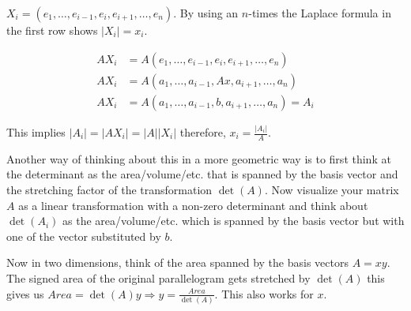 \(X_i = (e_1, \dots, e_{i - 1}, e_i, e_{i + 1}, \dots, e_n)\). By using an \(n\)-times the 
Laplace formula in the first row shows \(|X_i| = x_i\).

\begin{align*}
	A X_i &= A (e_1, \dots, e_{i - 1}, e_i, e_{i + 1}, \dots, e_n)\\
	A X_i &= A (a_1, \dots, a_{i - 1}, Ax, a_{i + 1}, \dots, a_n)\\
	A X_i &= A (a_1, \dots, a_{i - 1}, b, a_{i + 1}, \dots, a_n) = A_i
\end{align*}

This implies \(|A_i| = |AX_i| = |A||X_i|\) therefore, \(x_i = \frac{|A_i|}{A}\).

\QED

Another way of thinking about this in a more geometric way is to first think at the determinant as 
the area/volume/etc. that is spanned by the basis vector and the stretching factor of the transformation 
\(\det(A)\). Now visualize your matrix \(A\) as a linear transformation with 
a non-zero determinant and think about \(\det(A_i)\) as the area/volume/etc. which is spanned by the 
basis vector but with one of the vector substituted by \(b\).

Now in two dimensions, think of the area spanned by the basis vectors \(A = xy\). 
The signed area of the original parallelogram gets 
stretched by \(\det(A)\) this gives us \(Area = \det(A)y \Rightarrow y = \frac{Area}{\det(A)}\). This 
also works for \(x\).

